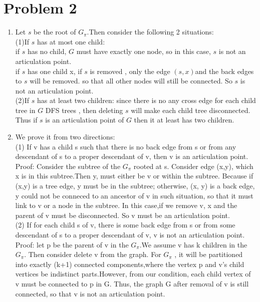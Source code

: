 \documentclass[paper=a4, fontsize=11pt]{scrartcl} %
\numberwithin{equation}{section} %
\numberwithin{figure}{section} %
\numberwithin{table}{section} %
\begin{document}
\section*{Problem 2}

\begin{enumerate}[label={2.(\alph*)}]
 \item Let ${s}$ be the root of ${G_\pi}$.Then consider the following 2 situations: \\
(1)If ${s}$ has at most one child: \\
if ${s}$ has no child, ${G}$ must have exactly one node, so in this case, ${s}$ is not an articulation point.\\
if ${s}$ has one child x, if ${s}$ is removed , only the edge ${(s,x)}$and the back edges to ${s}$ will be removed. so that all other nodes will still be connected. So ${s}$ is not an articulation point.\\
(2)If  ${s}$ has at least two children: since there is no any cross edge for each child tree in ${G}$ DFS trees , then deleting  ${s}$ will make each child tree disconnected. Thus if ${s}$ is an articulation point of ${G}$ then it at least has two children.

  \item 
We prove it from two directions:\\
(1) If v has a child s such that there is no back edge from s or from any descendant
of s to a proper descendant of v, then v is an articulation point.\\
Proof: Consider the subtree of the ${G_\pi}$ rooted at s. Consider edge (x,y), which x is  in this subtree.Then y, must either be v or within the subtree. Because if (x,y) is a tree edge, y must be in the subtree; otherwise, (x, y) is a back edge, y could not be conneced to an ancestor of v in such situation, so that it must link to v or a node in the subtree. In this case,if we remove v, x and the parent of v  must be disconnected. So v must be an articulation point.\\
(2) If for each child s of v, there is some back edge from s or from some descendant
of s to a proper descendant of v, v is not an articulation point. \\
Proof: let p be the parent of v in the ${G_\pi}$.We assume v has k children in the ${G_\pi}$. Then consider delete v from the graph. For ${G_\pi}$ , it will be partitioned into exactly (k+1) connected components,where the vertex p and v's child vertices be indistinct parts.However, from our condition, each child vertex of v  must be connected to p in G. Thus, the graph G after removal of v is still connected, so that v is not an articulation point.


\end{enumerate}
\end{document}
